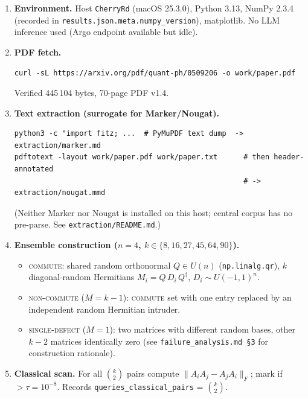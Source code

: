 \documentclass[11pt,letterpaper]{article}
\begin{document}
\begin{enumerate}
\item \textbf{Environment.} Host \texttt{CherryRd} (macOS 25.3.0), Python
      3.13, NumPy 2.3.4 (recorded in \texttt{results.json.meta.numpy\_version}),
      matplotlib. No LLM inference used (Argo endpoint available but idle).

\item \textbf{PDF fetch.}
      \begin{lstlisting}
curl -sL https://arxiv.org/pdf/quant-ph/0509206 -o work/paper.pdf
      \end{lstlisting}
      Verified 445\,104 bytes, 70-page PDF v1.4.

\item \textbf{Text extraction (surrogate for Marker/Nougat).}
      \begin{lstlisting}
python3 -c "import fitz; ...  # PyMuPDF text dump  -> extraction/marker.md
pdftotext -layout work/paper.pdf work/paper.txt      # then header-annotated
                                                     # -> extraction/nougat.mmd
      \end{lstlisting}
      (Neither Marker nor Nougat is installed on this host; central corpus has
      no pre-parse. See \texttt{extraction/README.md}.)

\item \textbf{Ensemble construction ($n=4$, $k \in \{8, 16, 27, 45, 64, 90\}$).}
      \begin{itemize}
      \item \textsc{commute}: shared random orthonormal $Q\in U(n)$
            (\texttt{np.linalg.qr}), $k$ diagonal-random Hermitians
            $M_i = Q \, D_i \, Q^\dagger$, $D_i \sim U(-1,1)^n$.
      \item \textsc{non-commute} ($M = k-1$): \textsc{commute} set with one
            entry replaced by an independent random Hermitian intruder.
      \item \textsc{single-defect} ($M = 1$): two matrices with different
            random bases, other $k-2$ matrices identically zero (see
            \texttt{failure\_analysis.md \S 3} for construction rationale).
      \end{itemize}

\item \textbf{Classical scan.} For all $\binom{k}{2}$ pairs compute
      $\|A_i A_j - A_j A_i\|_F$; mark if $> \tau = 10^{-8}$. Records
      \texttt{queries\_classical\_pairs} = $\binom{k}{2}$.


\end{enumerate}
\end{document}
